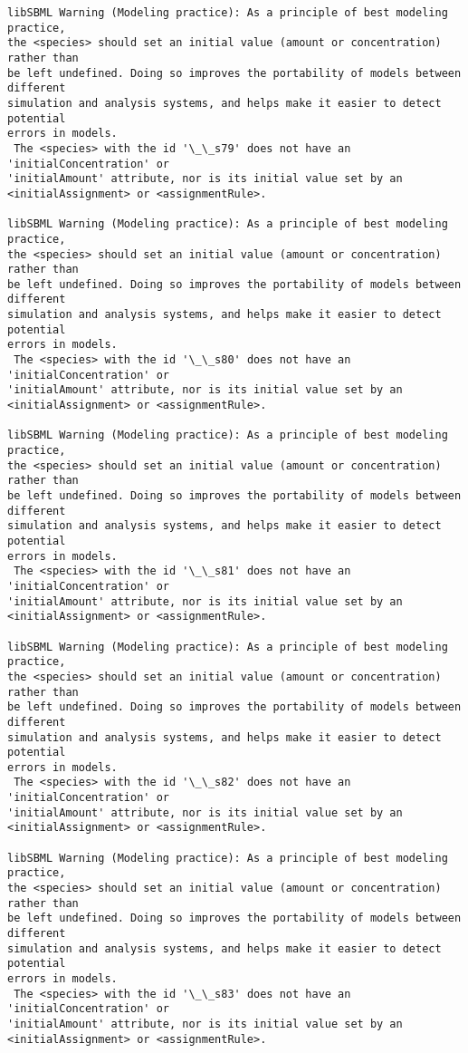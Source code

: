 \documentclass[11pt]{article}
\begin{document}
\begin{Verbatim}[commandchars=\\\{\}]
libSBML Warning (Modeling practice): As a principle of best modeling practice,
the <species> should set an initial value (amount or concentration) rather than
be left undefined. Doing so improves the portability of models between different
simulation and analysis systems, and helps make it easier to detect potential
errors in models.
 The <species> with the id '\_\_s79' does not have an 'initialConcentration' or
'initialAmount' attribute, nor is its initial value set by an
<initialAssignment> or <assignmentRule>.

libSBML Warning (Modeling practice): As a principle of best modeling practice,
the <species> should set an initial value (amount or concentration) rather than
be left undefined. Doing so improves the portability of models between different
simulation and analysis systems, and helps make it easier to detect potential
errors in models.
 The <species> with the id '\_\_s80' does not have an 'initialConcentration' or
'initialAmount' attribute, nor is its initial value set by an
<initialAssignment> or <assignmentRule>.

libSBML Warning (Modeling practice): As a principle of best modeling practice,
the <species> should set an initial value (amount or concentration) rather than
be left undefined. Doing so improves the portability of models between different
simulation and analysis systems, and helps make it easier to detect potential
errors in models.
 The <species> with the id '\_\_s81' does not have an 'initialConcentration' or
'initialAmount' attribute, nor is its initial value set by an
<initialAssignment> or <assignmentRule>.

libSBML Warning (Modeling practice): As a principle of best modeling practice,
the <species> should set an initial value (amount or concentration) rather than
be left undefined. Doing so improves the portability of models between different
simulation and analysis systems, and helps make it easier to detect potential
errors in models.
 The <species> with the id '\_\_s82' does not have an 'initialConcentration' or
'initialAmount' attribute, nor is its initial value set by an
<initialAssignment> or <assignmentRule>.

libSBML Warning (Modeling practice): As a principle of best modeling practice,
the <species> should set an initial value (amount or concentration) rather than
be left undefined. Doing so improves the portability of models between different
simulation and analysis systems, and helps make it easier to detect potential
errors in models.
 The <species> with the id '\_\_s83' does not have an 'initialConcentration' or
'initialAmount' attribute, nor is its initial value set by an
<initialAssignment> or <assignmentRule>.


\end{Verbatim}
\end{document}
